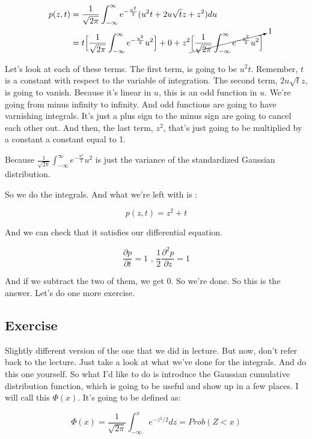 \documentclass{article}
\begin{document}
\begin{equation*} 
	\begin{split}
		p(z,t) &=   \frac{1}{\sqrt{2 \pi}} \int_{-\infty}^{\infty}  e^{-\frac{u^2}{2}} (u^2t + 2u \sqrt{t}z + z^2) du  \\	
		 &=   t \Big[\frac{1}{\sqrt{2 \pi}} \int_{-\infty}^{\infty}  e^{-\frac{u^2}{2}} u^2 \Big] + 0 + 
		 z^2 \cancelto{1}{\Big[\frac{1}{\sqrt{2 \pi}} \int_{-\infty}^{\infty}  e^{-\frac{u^2}{2}} u^2 \Big]}
	\end{split}
\end{equation*}

Let's look at each of these terms.
The first term,  is going to be $u^2t$.
Remember, $t$ is a constant with respect
to the variable of integration.
The second term, $ 2u \sqrt{t}z$, is going to vanish.
Because it's linear in $u$, this is an odd function in $u$.
We're going from minus infinity to infinity.
And odd functions are going to have varnishing integrals.
It's just a plus sign to the minus sign
are going to cancel each other out.
And then, the last term, $z^2$, that's just going to be multiplied by a constant a constant equal to 1.

Because $\frac{1}{\sqrt{2 \pi}} \int_{-\infty}^{\infty}  e^{-\frac{u^2}{2}} u^2$ is just the variance
of the standardized Gaussian distribution.

So we do the integrals. And what we're left with is :

	$$ p(z,t) = z^2+t $$
	

And we can check that it satisfies our differential
equation.

$$ \frac{\partial p}{\partial t} = 1 \text{ , } \frac{1}{2} \frac{\partial ^2 p}{\partial z} = 1 $$

And if we subtract the two of them, we get 0.
So we're done.
So this is the answer.
Let's do one more exercise.

\subsection*{Exercise}

Slightly different version of the one that we did in lecture.
But now, don't refer back to the lecture.
Just take a look at what we've done for the integrals.
And do this one yourself.
So what I'd like to do is introduce the Gaussian
cumulative distribution function,
which is going to be useful and show up in a few places.
I will call this $\Phi(x)$.
It's going to be defined as:

$$ \Phi(x) =  \frac{1}{\sqrt{2 \pi}}\int_{-\infty}^{x} e^{-z^2/2} dz = Prob(Z<x) $$
\end{document}
